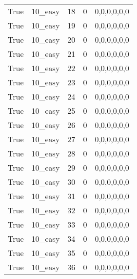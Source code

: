 \begin{tabular}{llrrl}
 True            & 10\_easy             &            18 &                     0 & 0,0,0,0,0,0   \\
 True            & 10\_easy             &            19 &                     0 & 0,0,0,0,0,0   \\
 True            & 10\_easy             &            20 &                     0 & 0,0,0,0,0,0   \\
 True            & 10\_easy             &            21 &                     0 & 0,0,0,0,0,0   \\
 True            & 10\_easy             &            22 &                     0 & 0,0,0,0,0,0   \\
 True            & 10\_easy             &            23 &                     0 & 0,0,0,0,0,0   \\
 True            & 10\_easy             &            24 &                     0 & 0,0,0,0,0,0   \\
 True            & 10\_easy             &            25 &                     0 & 0,0,0,0,0,0   \\
 True            & 10\_easy             &            26 &                     0 & 0,0,0,0,0,0   \\
 True            & 10\_easy             &            27 &                     0 & 0,0,0,0,0,0   \\
 True            & 10\_easy             &            28 &                     0 & 0,0,0,0,0,0   \\
 True            & 10\_easy             &            29 &                     0 & 0,0,0,0,0,0   \\
 True            & 10\_easy             &            30 &                     0 & 0,0,0,0,0,0   \\
 True            & 10\_easy             &            31 &                     0 & 0,0,0,0,0,0   \\
 True            & 10\_easy             &            32 &                     0 & 0,0,0,0,0,0   \\
 True            & 10\_easy             &            33 &                     0 & 0,0,0,0,0,0   \\
 True            & 10\_easy             &            34 &                     0 & 0,0,0,0,0,0   \\
 True            & 10\_easy             &            35 &                     0 & 0,0,0,0,0,0   \\
 True            & 10\_easy             &            36 &                     0 & 0,0,0,0,0,0   \\

\end{tabular}
